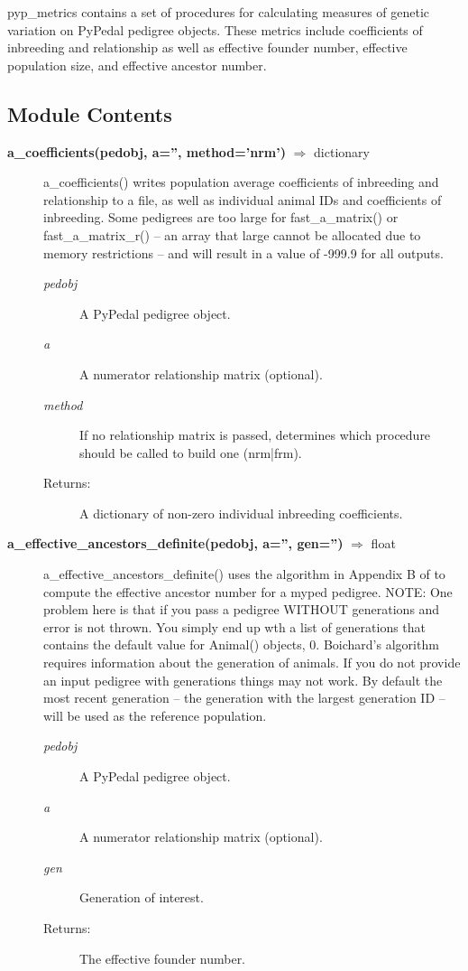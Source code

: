 pyp\_metrics contains a set of procedures for calculating measures of genetic variation on PyPedal pedigree objects. These metrics include coefficients of inbreeding and relationship as well as effective founder number, effective population size, and effective ancestor number.
\subsection*{Module Contents}
\begin{description}

\item[\textbf{a\_coefficients(pedobj, a='', method='nrm')} $\Rightarrow$ dictionary]
a\_coefficients() writes population average coefficients of inbreeding and relationship to a file, as well as individual animal IDs and coefficients of inbreeding. Some pedigrees are too large for fast\_a\_matrix() or fast\_a\_matrix\_r() -- an array that large cannot be allocated due to memory restrictions -- and will result in a value of -999.9 for all outputs.
\begin{description}
\item[\emph{pedobj}] A PyPedal pedigree object.
\item[\emph{a}] A numerator relationship matrix (optional).
\item[\emph{method}] If no relationship matrix is passed, determines which procedure should be called to build one (nrm|frm).
\item[Returns:] A dictionary of non-zero individual inbreeding coefficients.
\end{description}

\item[\textbf{a\_effective\_ancestors\_definite(pedobj, a='', gen='')} $\Rightarrow$ float]
a\_effective\_ancestors\_definite() uses the algorithm in Appendix B of  to compute the effective ancestor number for a myped pedigree. NOTE: One problem here is that if you pass a pedigree WITHOUT generations and error is not thrown. You simply end up wth a list of generations that contains the default value for Animal() objects, 0. Boichard's algorithm requires information about the generation of animals. If you do not provide an input pedigree with generations things may not work. By default the most recent generation -- the generation with the largest generation ID -- will be used as the reference population.
\begin{description}
\item[\emph{pedobj}] A PyPedal pedigree object.
\item[\emph{a}] A numerator relationship matrix (optional).
\item[\emph{gen}] Generation of interest.
\item[Returns:] The effective founder number.
\end{description}


\end{description}
